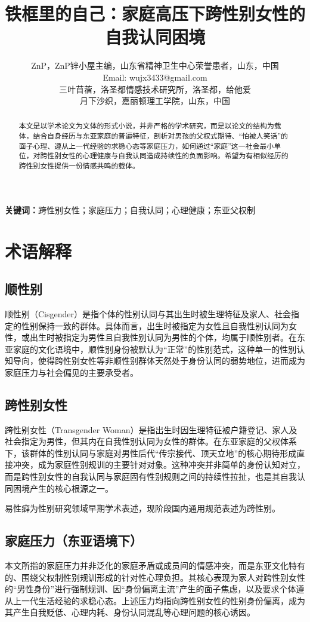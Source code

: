 \documentclass[twocolumn]{ctexart}
\title{铁框里的自己：家庭高压下跨性别女性的自我认同困境}
\author{ZnP，ZnP锌小屋主编，山东省精神卫生中心荣誉患者，山东，中国\\Email: wujx3433@gmail.com\\三叶苜蓿，洛圣都情感技术研究所，洛圣都，给他爱\\月下沙织，嘉丽顿理工学院，山东，中国}
\date{}
\newcommand{\keywords}[1]{\noindent\textbf{关键词：}\kaishu #1\normalfont}
\begin{document}
\maketitle

\begin{abstract}
本文是以学术论文为文体的形式小说，并非严格的学术研究，而是以论文的结构为载体，结合自身经历与东亚家庭的普遍特征，剖析对男孩的父权式期待、“怕被人笑话”的面子心理、遵从上一代经验的求稳心态等家庭压力，如何通过“家庭”这一社会最小单位，对跨性别女性的心理健康与自我认同造成持续性的负面影响。希望为有相似经历的跨性别女性提供一份情感共鸣的载体。
\end{abstract} 

\keywords{跨性别女性；家庭压力；自我认同；心理健康；东亚父权制}
\section{术语解释}
\subsection {顺性别}
顺性别（Cisgender）是指个体的性别认同与其出生时被生理特征及家人、社会指定的性别保持一致的群体。具体而言，出生时被指定为女性且自我性别认同为女性，或出生时被指定为男性且自我性别认同为男性的个体，均属于顺性别者。在东亚家庭的文化语境中，顺性别身份被默认为“正常”的性别范式，这种单一的性别认知导向，使得跨性别女性等非顺性别群体天然处于身份认同的弱势地位，进而成为家庭压力与社会偏见的主要承受者\cite{lgbtmental2021health}。

\subsection {跨性别女性}
跨性别女性（Transgender Woman）是指出生时因生理特征被户籍登记、家人及社会指定为男性，但其内在自我性别认同为女性的群体\cite{pan2023gendertrouble, beitongtranscare}。在东亚家庭的父权体系下，该群体的性别认同与家庭对男性后代“传宗接代、顶天立地”的核心期待形成直接冲突，成为家庭性别规训的主要针对对象。这种冲突并非简单的身份认知对立，而是跨性别女性的自我认同与家庭固有性别规则之间的持续性拉扯，也是其自我认同困境产生的核心根源之一。

易性癖为性别研究领域早期学术表述，现阶段国内通用规范表述为跨性别。

\subsection {家庭压力（东亚语境下）}
本文所指的家庭压力并非泛化的家庭矛盾或成员间的情感冲突，而是东亚文化特有的、围绕父权制性别规训形成的针对性心理负担。其核心表现为家人对跨性别女性的“男性身份”进行强制规训、因“身份偏离主流”产生的面子焦虑，以及要求个体遵从上一代生活经验的求稳心态。上述压力均指向跨性别女性的性别身份偏离，成为其产生自我贬低、心理内耗、身份认同混乱等心理问题的核心诱因。
\end{document}
